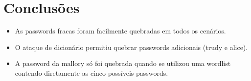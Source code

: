 \section*{Conclusões}

\begin{itemize} \item As passwords fracas foram facilmente quebradas em todos os cenários. \item O ataque de dicionário permitiu quebrar passwords adicionais (trudy e alice). \item A password da mallory só foi quebrada quando se utilizou uma wordlist contendo diretamente as cinco possíveis passwords. \end{itemize}
